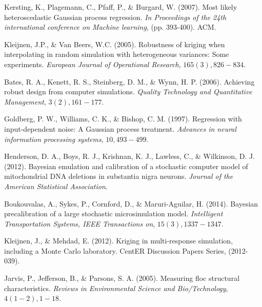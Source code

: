 \documentclass[12pt,titlepage]{report}
\theoremstyle{definition}
\theoremstyle{remark}
\begin{document}
\begin{thebibliography}{94}
 Kersting, K., Plagemann, C., Pfaff, P., \& Burgard, W. (2007). Most likely heteroscedastic Gaussian process regression. {\it In Proceedings of the 24th international conference on Machine learning}, (pp. 393-400). ACM.

 Kleijnen, J.P., \& Van Beers, W.C. (2005). Robustness of kriging when interpolating in random simulation with heterogeneous variances: Some experiments. {\it European Journal of Operational Research}, $165(3), 826-834$.

 Bates, R. A., Kenett, R. S., Steinberg, D. M., \& Wynn, H. P. (2006). Achieving robust design from computer simulations. {\it Quality Technology and Quantitative Management}, $3(2), 161-177$.

 Goldberg, P. W., Williams, C. K., \& Bishop, C. M. (1997). Regression with input-dependent noise: A Gaussian process treatment. {\it Advances in neural information processing systems}, $10, 493-499$.

 Henderson, D. A., Boys, R. J., Krishnan, K. J., Lawless, C., \& Wilkinson, D. J. (2012). Bayesian emulation and calibration of a stochastic computer model of mitochondrial DNA deletions in substantia nigra neurons. {\it Journal of the American Statistical Association}.

 Boukouvalas, A., Sykes, P., Cornford, D., \& Maruri-Aguilar, H. (2014). Bayesian precalibration of a large stochastic microsimulation model. {\it Intelligent Transportation Systems, IEEE Transactions on}, $15(3), 1337-1347$.

 Kleijnen, J., \& Mehdad, E. (2012). Kriging in multi-response simulation, including a Monte Carlo laboratory. {CentER Discussion Papers Series}, (2012-039).


 Jarvis, P., Jefferson, B., \& Parsons, S. A. (2005). Measuring floc structural characteristics. {\it Reviews in Environmental Science and Bio/Technology}, $4(1-2), 1-18$.

\end{thebibliography}{}
\end{document}
